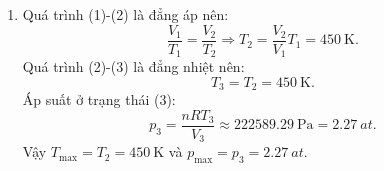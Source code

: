 \begin{ex}
{\begin{enumerate}[label=\alph*)]
\begin{minipage}{0.5\textwidth}
\begin{center}
				\end{center}
			\end{minipage}
			\item Quá trình (1)-(2) là đẳng áp nên:
			$$\dfrac{V_1}{T_1}=\dfrac{V_2}{T_2}\Rightarrow T_2=\dfrac{V_2}{V_1}T_1=\SI{450}{\kelvin}.$$
			Quá trình (2)-(3) là đẳng nhiệt nên:
			$$T_3=T_2=\SI{450}{\kelvin}.$$
			Áp suất ở trạng thái (3):
			$$p_3=\dfrac{n RT_3}{V_3}\approx\SI{222589.29}{\pascal}=\SI{2.27}{at}.$$
			Vậy $T_\text{max}=T_2=\SI{450}{\kelvin}$ và $p_\text{max}=p_3=\SI{2.27}{at}.$
		\end{enumerate}
	}
\end{ex}

